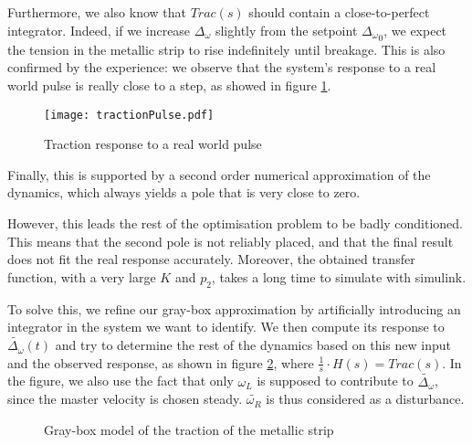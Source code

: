 Furthermore, we also know that $Trac(s)$ should contain a close-to-perfect integrator. Indeed, if we increase $\Delta_\omega$ slightly from the setpoint ${\Delta_\omega}_0$, we expect the tension in the metallic strip to rise indefinitely until breakage. This is also confirmed by the experience: we observe that the system's response to a real world pulse is really close to a step, as showed in figure \ref{fig:tracImpulseResponse}.
\begin{figure}[htbp]
\centering
\texttt{[image: tractionPulse.pdf]}
\caption{Traction response to a real world pulse\label{fig:tracImpulseResponse}}
\end{figure}
Finally, this is supported by a second order numerical approximation of the dynamics, which always yields a pole that is very close to zero.

However, this leads the rest of the optimisation problem to be badly conditioned. This means that the second pole is not reliably placed, and that the final result does not fit the real response accurately. Moreover, the obtained transfer function, with a very large $K$ and $p_2$, takes a long time to simulate with simulink.

To solve this, we refine our gray-box approximation by artificially introducing an integrator in the system we want to identify. We then compute its response to $\tilde{\Delta_\omega}(t)$ and try to determine the rest of the dynamics based on this new input and the observed response, as shown in figure \ref{fig:tractionGrayBox}, where $\frac{1}{s}\cdot H(s) = Trac(s)$. In the figure, we also use the fact that only $\omega_L$ is supposed to contribute to $\tilde{\Delta_\omega}$, since the master velocity is chosen steady. $\tilde{\omega_R}$ is thus considered as a disturbance.
\begin{figure}[htbp]
\centering
{}
\caption{Gray-box model of the traction of the metallic strip\label{fig:tractionGrayBox}}
\end{figure}

